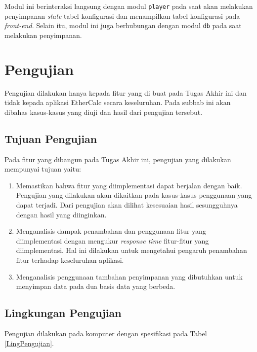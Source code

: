 	Modul ini berinteraksi langsung dengan modul \texttt{player} pada saat akan melakukan penyimpanan \textit{state} tabel konfigurasi dan menampilkan tabel konfigurasi pada \textit{front-end}. Selain itu, modul ini juga berhubungan dengan modul \texttt{db} pada saat melakukan penyimpanan.

\section{Pengujian}
Pengujian dilakukan hanya kepada fitur yang di buat pada Tugas Akhir ini dan tidak kepada aplikasi EtherCalc secara keseluruhan. Pada subbab ini akan dibahas kasus-kasus yang diuji dan hasil dari pengujian tersebut.

	\subsection{Tujuan Pengujian}
	Pada fitur yang dibangun pada Tugas Akhir ini, pengujian yang dilakukan mempunyai tujuan yaitu:
	\begin{enumerate}
		\item Memastikan bahwa fitur yang diimplementasi dapat berjalan dengan baik. Pengujian yang dilakukan akan dikaitkan pada kasus-kasus penggunaan yang dapat terjadi. Dari pengujian akan dilihat kesesuaian hasil sesungguhnya dengan hasil yang diinginkan.
		\item Menganalisis dampak penambahan dan penggunaan fitur yang diimplementasi dengan mengukur \textit{response time} fitur-fitur yang diimplementasi. Hal ini dilakukan untuk mengetahui pengaruh penambahan fitur terhadap keseluruhan aplikasi.
		\item Menganalisis penggunaan tambahan penyimpanan yang dibutuhkan untuk menyimpan data pada dua basis data yang berbeda.
	\end{enumerate}

	\subsection{Lingkungan Pengujian}
	Pengujian dilakukan pada komputer dengan spesifikasi pada Tabel \ref{LingPengujian}.

